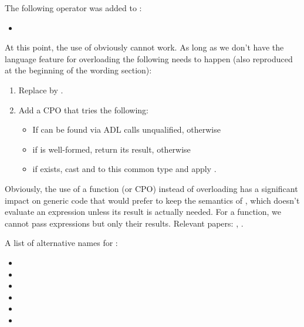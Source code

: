 The following operator was added to \simd:
\begin{itemize}
  \item {}
\end{itemize}

At this point, the use of  obviously cannot work.
As long as we don't have the language feature for overloading  the
following needs to happen (also reproduced at the beginning of the wording
section):
\begin{enumerate}
  \item Replace  by .
  \item Add a \std{} CPO that tries the following:
    \begin{itemize}
      \item If  can be found via ADL calls  unqualified, otherwise
      \item if  is well-formed, return its result, otherwise
      \item if \std{} exists, cast  and  to this common type and apply .
    \end{itemize}
\end{enumerate}
Obviously, the use of a function (or CPO) instead of overloading
 has a significant impact on generic code that would prefer to
keep the semantics of , which doesn't evaluate an expression unless
its result is actually needed.
For a function, we cannot pass expressions but only their results.
Relevant papers: \cite{P0927R2}, \cite{D0917}.

A list of alternative names for \std{}:
\begin{itemize}
  \item \std{}
  \item \std{}
  \item \std{}
  \item \std{}
  \item \std{}
  \item \std{}
\end{itemize}

